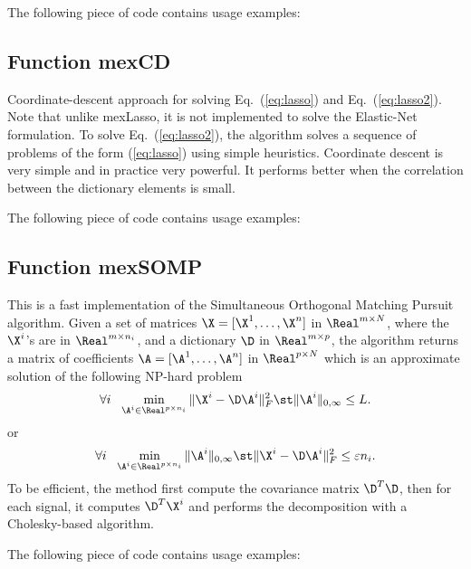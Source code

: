 \documentclass[a4paper, 11pt]{article}
\begin{document}
%    

The following piece of code contains usage examples:


\subsection{Function mexCD}
Coordinate-descent approach for solving Eq.~(\ref{eq:lasso}) and
Eq.~(\ref{eq:lasso2}). Note that unlike mexLasso, it is not implemented to solve the Elastic-Net formulation.
To solve Eq.~(\ref{eq:lasso2}), the algorithm solves a
sequence of problems of the form (\ref{eq:lasso}) using simple heuristics.
Coordinate descent is very simple and in practice very powerful. It performs
better when the correlation between the dictionary elements is small. 

%    

The following piece of code contains usage examples:


\subsection{Function mexSOMP}
This is a fast implementation of the Simultaneous Orthogonal Matching Pursuit algorithm. Given a set of matrices $\X=[\X^1,\ldots,\X^n]$  in $\Real^{m \times N}$, where the $\X^i$'s are in $\Real^{m \times n_i}$, and a dictionary $\D$ in $\Real^{m \times p}$, the algorithm returns a matrix of coefficients $\A=[\A^1,\ldots,\A^n]$ in $\Real^{p \times N}$ which is an approximate solution of the following NP-hard problem
\begin{equation}
\forall i~~ \min_{\A^i \in \Real^{p \times n_i}} \|\X^i-\D\A^i\|_F^2 \st \|\A^i\|_{0,\infty} \leq L.
\end{equation}
or 
\begin{equation}
\forall i~~ \min_{\A^i \in \Real^{p \times n_i}}  \|\A^i\|_{0,\infty} \st \|\X^i-\D\A^i\|_F^2 \leq \varepsilon n_i.
\end{equation}
To be efficient, the method first compute the covariance matrix $\D^T\D$, then for each signal, it computes $\D^T\X^i$ and performs the decomposition with a Cholesky-based algorithm.

%    

The following piece of code contains usage examples:

\end{document}
